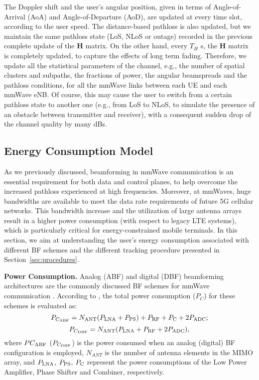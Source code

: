\documentclass[conference]{IEEEtran}
\begin{document}
The Doppler shift and the user's angular position, given in terms of Angle-of-Arrival (AoA) and Angle-of-Departure (AoD), are updated at every time slot, according to the user speed. 
The distance-based pathloss is also updated, but we maintain the same pathloss state (LoS, NLoS or outage) recorded in the previous complete update of the \textbf{H} matrix.
On the other hand, every $T_H$ s, the \textbf{H} matrix is completely updated, to capture the effects of  long term fading.
 Therefore, we update all the statistical parameters of the channel, e.g., the number of spatial clusters and subpaths, the fractions of power, the angular beamspreads and the pathloss conditions, for all the mmWave links between each UE and each mmWave eNB. Of course, this may cause the user to switch from a certain pathloss state to another one (e.g., from LoS to NLoS, to simulate the presence of an obstacle between transmitter and receiver), with a consequent sudden drop of the channel quality by many dBs.





\subsection{Energy Consumption Model}
\label{sec:EC}

As we  previously discussed, beamforming in mmWave communication is
an essential requirement for both data and control planes, to help overcome the increased pathloss experienced at high frequencies.
Moreover, at mmWaves, huge bandwidths are available to meet the data rate requirements of future 5G cellular networks. 
This bandwidth increase and the utilization of large antenna arrays result in a higher power consumption (with respect to  legacy LTE systems), which is particularly critical for energy-constrained mobile terminals. 
In this section, we aim at understanding the user's energy consumption associated with different BF schemes and the different tracking procedure presented in Section~\ref{sec:procedures}. 

\textbf{Power Consumption.} Analog (ABF) and digital (DBF) beamforming architectures are the commonly discussed BF schemes for mmWave communication \cite{Sun_Rappaport_BF}. According to \cite{Waqas_EW2016}, the total power consumption ($P_C$) for these schemes is evaluated as:
\begin{equation}
P_{C_{\rm ABF}} = N_{\rm ANT}(P_{\rm LNA} + P_{\rm PS}) + P_{\rm RF} + P_{\rm C} + 2P_{\rm ADC};
\label{eq:ABF}
\end{equation}
\begin{equation}
P_{C_{\rm DBF}} = N_{\rm ANT}(P_{\rm LNA} +  P_{\rm RF} + 2P_{\rm ADC}),
\label{eq:DBF}
\end{equation}
where $P{C_{\rm ABF}}$ ($P_{C_{\rm DBF}}$) is the power consumed when an analog (digital) BF configuration is employed, $N_{ANT}$ is the number of antenna elements in the MIMO array, and $P_{\rm LNA}$, $P_{\rm PS}$, $P_{\rm C}$ represent the power consumptions of the Low Power Amplifier, Phase Shifter and Combiner, respectively.
\end{document}
